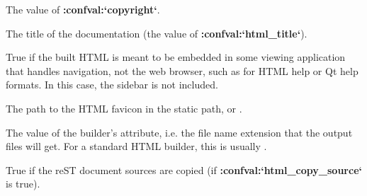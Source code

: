\documentclass[letterpaper,10pt,english]{sphinxmanual}
\begin{document}

\begin{fulllineitems}
\label{templating:copyright}
The value of {\color{red}\bfseries{}:confval:{}`copyright{}`}.

\end{fulllineitems}


\begin{fulllineitems}
\label{templating:docstitle}
The title of the documentation (the value of {\color{red}\bfseries{}:confval:{}`html\_title{}`}).

\end{fulllineitems}


\begin{fulllineitems}
\label{templating:embedded}
True if the built HTML is meant to be embedded in some viewing application
that handles navigation, not the web browser, such as for HTML help or Qt
help formats.  In this case, the sidebar is not included.

\end{fulllineitems}


\begin{fulllineitems}
\label{templating:favicon}
The path to the HTML favicon in the static path, or .

\end{fulllineitems}


\begin{fulllineitems}
\label{templating:file_suffix}
The value of the builder's {\hyperref[builders:sphinx.builders.html.SerializingHTMLBuilder.out_suffix]{}}
attribute, i.e. the file name extension that the output files will get.  For
a standard HTML builder, this is usually .

\end{fulllineitems}


\begin{fulllineitems}
\label{templating:has_source}
True if the reST document sources are copied (if {\color{red}\bfseries{}:confval:{}`html\_copy\_source{}`}
is true).

\end{fulllineitems}
\end{document}
